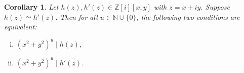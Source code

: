 \documentclass[12pt,table]{article}
\newtheorem{corollary}[theorem]{Corollary}
\theoremstyle{definition}
\theoremstyle{remark}
\newcommand{\Nnn}{\mathbb N}
\newcommand{\Zzz}{\mathbb Z}
\newcommand{\vanish}[1]{}
\newcommand{\divides}{\mid}
\numberwithin{equation}{section}
\begin{document}
\vanish{
\begin{corollary}
Let $ h(z), h'(z) \in \Zzz[i][x,y] $ with $ z = x+ iy $.
\[
h(z) \simeq h'(z) 
\implies 
( \forall u \in \Nnn \cup \{ 0 \},  ( x^2 + y^2 ) ^ u \divides h(z)  \iff ( x^2 + y^2 ) ^ u \divides h'(z)  )
\]
\end{corollary}
}

\begin{corollary}
\label{corollary_equivalence}
Let $ h(z), h'(z) \in \Zzz[i][x,y] $ with $ z = x+ iy $.
Suppose $ h(z) \simeq h'(z) $. Then for all  $ u \in \Nnn \cup \{ 0 \} $,
the following two conditions are
equivalent:
\begin{enumerate}[i.]
\item $ ( x^2 + y^2 ) ^ u \divides h(z) $,
\item $ ( x^2 + y^2 ) ^ u \divides h'(z) $.
\end{enumerate}
\end{corollary}
\end{document}
